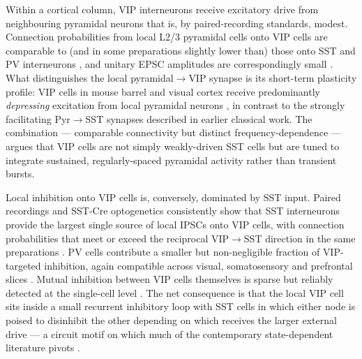 \documentclass[11pt]{article}
\let\origrightarrow\rightarrow
\def\rightarrow{\ensuremath{\origrightarrow}}
\begin{document}
Within a cortical column, VIP interneurons receive excitatory drive from neighbouring pyramidal neurons that is, by paired-recording standards, modest. Connection probabilities from local L2/3 pyramidal cells onto VIP cells are comparable to (and in some preparations slightly lower than) those onto SST and PV interneurons \citep{Karnani2016a}, and unitary EPSC amplitudes are correspondingly small \citep{Karnani2016a, Walker2016, Pronneke2015}. What distinguishes the local pyramidal\rightarrow VIP synapse is its short-term plasticity profile: VIP cells in mouse barrel and visual cortex receive predominantly \textit{depressing} excitation from local pyramidal neurons \citep{Karnani2016a, Cauli2014}, in contrast to the strongly facilitating Pyr\rightarrow SST synapses described in earlier classical work. The combination --- comparable connectivity but distinct frequency-dependence --- argues that VIP cells are not simply weakly-driven SST cells but are tuned to integrate sustained, regularly-spaced pyramidal activity rather than transient bursts.

Local inhibition onto VIP cells is, conversely, dominated by SST input. Paired recordings and SST-Cre optogenetics consistently show that SST interneurons provide the largest single source of local IPSCs onto VIP cells, with connection probabilities that meet or exceed the reciprocal VIP\rightarrow SST direction in the same preparations \citep{Pfeffer2013, Karnani2016a, Walker2016}. PV cells contribute a smaller but non-negligible fraction of VIP-targeted inhibition, again compatible across visual, somatosensory and prefrontal slices \citep{Pfeffer2013, Walker2016, Pronneke2019}. Mutual inhibition between VIP cells themselves is sparse but reliably detected at the single-cell level \citep{Karnani2016b, Karnani2016a, Walker2016}. The net consequence is that the local VIP cell sits inside a small recurrent inhibitory loop with SST cells in which either node is poised to disinhibit the other depending on which receives the larger external drive --- a circuit motif on which much of the contemporary state-dependent literature pivots \citep{Pfeffer2013, Pi2013, Karnani2016a, Sabri2024, Lee2013}.
\end{document}
